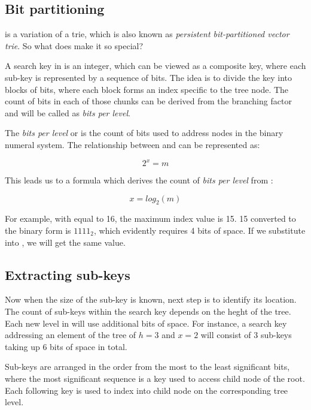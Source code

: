 \subsection*{Bit partitioning}

\rbtree is a variation of a trie, which is also known as \emph{persistent bit-partitioned vector trie}. So what does make it so special? 

A search key in \rbtree is an integer, which can be viewed as a composite key, where each sub-key is represented by a sequence of bits. The idea is to divide the key into blocks of bits, where each block forms an index specific to the tree node. The count of bits in each of those chunks can be derived from the branching factor and will be called as \emph{bits per level}.

The \emph{bits per level} or \x is the count of bits used to address \m nodes in the binary numeral system. The relationship between \m and \x can be represented as: 

\begin{equation}
    2^x = m
\end{equation}

This leads us to a formula which derives the count of \emph{bits per level} from \m: 

\begin{equation}
    \label{eq:bits-per-level}
    x = log_2(m)
\end{equation}

For example, with \m equal to 16, the maximum index value is 15. 15 converted to the binary form is $1111_2$, which evidently requires 4 bits of space. If we substitute \m into , we will get the same value. 

\subsection*{Extracting sub-keys}

Now when the size of the sub-key is known, next step is to identify its location. The count of sub-keys within the search key depends on the heght of the tree. Each new level in \rbtree will use \x additional bits of space. For instance, a search key addressing an element of the tree of ${h = 3}$ and ${x = 2}$ will consist of 3 sub-keys taking up 6 bits of space in total.

Sub-keys are arranged in the order from the most to the least significant bits, where the most significant sequence is a key used to access child node of the root. Each following key is used to index into child node on the corresponding tree level.

